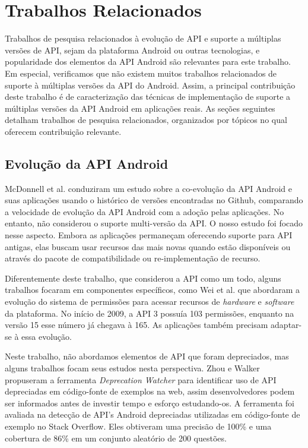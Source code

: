 \chapter{Trabalhos Relacionados} \label{ch:trabalhos-relacionados}

Trabalhos de pesquisa relacionados à evolução de API e suporte a múltiplas versões
de API, sejam da plataforma Android ou outras tecnologias, e popularidade dos
elementos da API Android são relevantes para este trabalho. Em especial, verificamos
que não existem muitos trabalhos relacionados de suporte à múltiplas versões da API
do Android. Assim, a principal contribuição deste trabalho é de caracterização das
técnicas de implementação de suporte a múltiplas versões da API Android em aplicações
reais. As seções seguintes detalham trabalhos de pesquisa relacionados, organizados
por tópicos no qual oferecem contribuição relevante.

\section{Evolução da API Android}

McDonnell et al. \cite{McDonnell2013} conduziram um estudo sobre a co-evolução da API
Android e suas aplicações usando o histórico de versões encontradas no Github, comparando
a velocidade de evolução da API Android com a adoção pelas aplicações. No entanto, não
considerou o suporte multi-versão da API. O nosso estudo foi focado nesse aspecto. Embora
as aplicações permaneçam oferecendo suporte para API antigas, elas buscam usar recursos das
mais novas quando estão disponíveis ou através do pacote de compatibilidade ou re-implementação
de recurso.

Diferentemente deste trabalho, que considerou a API como um todo, alguns trabalhos focaram
em componentes específicos, como Wei et al.\cite{Wei2012} que abordaram a evolução do sistema
de permissões para acessar recursos de \textit{hardware} e \textit{software} da plataforma.
No início de 2009, a API 3 possuía 103 permissões, enquanto na versão 15 esse número já chegava
à 165. As aplicações também precisam adaptar-se à essa evolução. 

Neste trabalho, não abordamos elementos de API que foram depreciados, mas alguns trabalhos
focam seus estudos nesta perspectiva.  Zhou e Walker \cite{Zhou2016} propuseram a ferramenta
\textit{Deprecation Watcher} para identificar uso de API depreciadas em código-fonte de exemplos
na web, assim desenvolvedores podem ser informados antes de investir tempo e esforço estudando-os.
A ferramenta foi avaliada na detecção de API's Android depreciadas utilizadas em código-fonte de exemplo no Stack Overflow. Eles obtiveram uma precisão de 100\% e uma cobertura de 86\% em um
conjunto aleatório de 200 questões.

